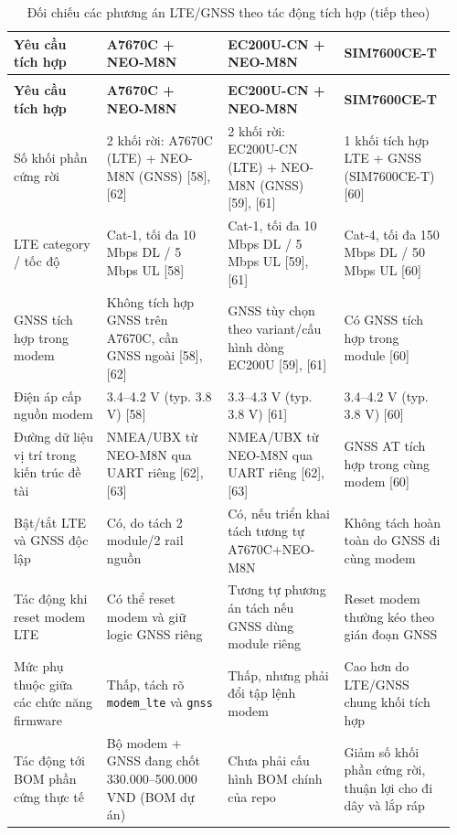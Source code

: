 \documentclass[a4paper]{extarticle}
\newcommand{\thesissettableid}[2]{%
  \renewcommand{\thetable}{#1}%
  \renewcommand{\theHtable}{#2}%
}
\begin{document}
{\thesissettableid{3.3}{tab-ch3-oi-chieu-cac-phuong-an-lte-gnss-theo-tac-ong-tich-hop}
\def\LTcaptype{table}
\begin{longtable}{|L{0.202\linewidth}|L{0.260\linewidth}|L{0.252\linewidth}|L{0.241\linewidth}|}
\caption{Đối chiếu các phương án LTE/GNSS theo tác động tích hợp}\label{tab:ch3-oi-chieu-cac-phuong-an-lte-gnss-theo-tac-ong-tich-hop}\\
\hline \textbf{Yêu cầu tích hợp} & \textbf{A7670C + NEO-M8N} & \textbf{EC200U-CN + NEO-M8N} & \textbf{SIM7600CE-T} \\
\hline
\endfirsthead
\caption[]{Đối chiếu các phương án LTE/GNSS theo tác động tích hợp (tiếp theo)}\\
\hline \textbf{Yêu cầu tích hợp} & \textbf{A7670C + NEO-M8N} & \textbf{EC200U-CN + NEO-M8N} & \textbf{SIM7600CE-T} \\
\hline
\endhead
\hline
\endfoot
\endlastfoot
Số khối phần cứng rời & 2 khối rời: A7670C (LTE) + NEO-M8N (GNSS)
{[}58{]}, {[}62{]} & 2 khối rời: EC200U-CN (LTE) + NEO-M8N (GNSS)
{[}59{]}, {[}61{]} & 1 khối tích hợp LTE + GNSS (SIM7600CE-T) {[}60{]} \\\hline
LTE category / tốc độ & Cat-1, tối đa 10 Mbps DL / 5 Mbps UL {[}58{]} &
Cat-1, tối đa 10 Mbps DL / 5 Mbps UL {[}59{]}, {[}61{]} & Cat-4, tối đa
150 Mbps DL / 50 Mbps UL {[}60{]} \\\hline
GNSS tích hợp trong modem & Không tích hợp GNSS trên A7670C, cần GNSS
ngoài {[}58{]}, {[}62{]} & GNSS tùy chọn theo variant/cấu hình dòng
EC200U {[}59{]}, {[}61{]} & Có GNSS tích hợp trong module {[}60{]} \\\hline
Điện áp cấp nguồn modem & 3.4--4.2 V (typ. 3.8 V) {[}58{]} & 3.3--4.3 V
(typ. 3.8 V) {[}61{]} & 3.4--4.2 V (typ. 3.8 V) {[}60{]} \\\hline
Đường dữ liệu vị trí trong kiến trúc đề tài & NMEA/UBX từ NEO-M8N qua
UART riêng {[}62{]}, {[}63{]} & NMEA/UBX từ NEO-M8N qua UART riêng
{[}62{]}, {[}63{]} & GNSS AT tích hợp trong cùng modem {[}60{]} \\\hline
Bật/tắt LTE và GNSS độc lập & Có, do tách 2 module/2 rail nguồn & Có,
nếu triển khai tách tương tự A7670C+NEO-M8N & Không tách hoàn toàn do
GNSS đi cùng modem \\\hline
Tác động khi reset modem LTE & Có thể reset modem và giữ logic GNSS
riêng & Tương tự phương án tách nếu GNSS dùng module riêng & Reset modem
thường kéo theo gián đoạn GNSS \\\hline
Mức phụ thuộc giữa các chức năng firmware & Thấp, tách rõ
\texttt{modem\_lte} và \texttt{gnss} & Thấp, nhưng phải đổi tập lệnh
modem & Cao hơn do LTE/GNSS chung khối tích hợp \\\hline
Tác động tới BOM phần cứng thực tế & Bộ modem + GNSS đang chốt
330.000--500.000 VND (BOM dự án) & Chưa phải cấu hình BOM chính của repo
& Giảm số khối phần cứng rời, thuận lợi cho đi dây và lắp ráp \\\hline
\end{longtable}
}
\end{document}
